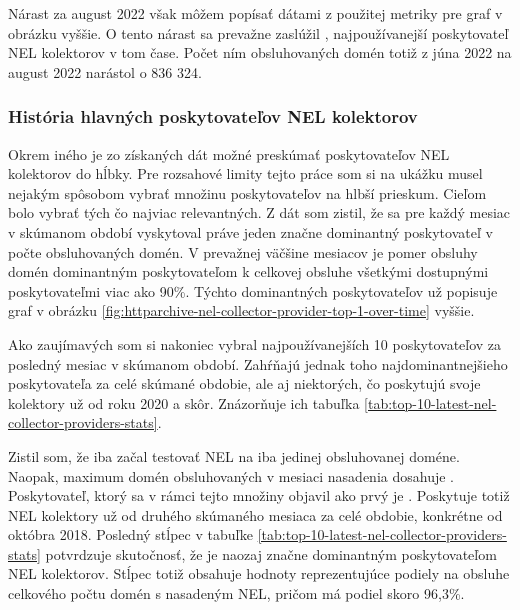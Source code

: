 \pagebreak

Nárast za august 2022 však môžem popísať dátami z použitej metriky pre graf v obrázku vyššie.
O tento nárast sa prevažne zaslúžil , najpoužívanejší poskytovateľ NEL kolektorov v tom čase. 
Počet ním obsluhovaných domén totiž z júna 2022 na august 2022 narástol o 836 324.

\subsubsection{História hlavných poskytovateľov NEL kolektorov}

Okrem iného je zo získaných dát možné preskúmať poskytovateľov NEL kolektorov do hĺbky.
Pre rozsahové limity tejto práce som si na ukážku musel nejakým spôsobom vybrať množinu poskytovateľov na hlbší prieskum.
Cieľom bolo vybrať tých čo najviac relevantných.
Z dát som zistil, že sa pre každý mesiac v skúmanom období vyskytoval práve jeden značne dominantný poskytovateľ v počte obsluhovaných domén.
V prevažnej väčšine mesiacov je pomer obsluhy domén dominantným poskytovateľom k celkovej obsluhe všetkými dostupnými poskytovateľmi viac ako 90\%.
Týchto dominantných poskytovateľov už popisuje graf v obrázku \ref{fig:httparchive-nel-collector-provider-top-1-over-time} vyššie.

Ako zaujímavých som si nakoniec vybral najpoužívanejších 10 poskytovateľov za posledný mesiac v skúmanom období.
Zahŕňajú jednak toho najdominantnejšieho poskytovateľa za celé skúmané obdobie, ale aj niektorých, čo poskytujú svoje kolektory už od roku 2020 a skôr.
Znázorňuje ich tabuľka \ref{tab:top-10-latest-nel-collector-providers-stats}.

Zistil som, že iba  začal testovať NEL na iba jedinej obsluhovanej doméne. Naopak, maximum domén obsluhovaných v mesiaci nasadenia dosahuje .
Poskytovateľ, ktorý sa v rámci tejto množiny objavil ako prvý je .
Poskytuje totiž NEL kolektory už od druhého skúmaného mesiaca za celé obdobie, konkrétne od októbra 2018.
Posledný stĺpec v tabuľke \ref{tab:top-10-latest-nel-collector-providers-stats} potvrdzuje skutočnosť, že  je naozaj značne dominantným poskytovateľom NEL kolektorov.
Stĺpec totiž obsahuje hodnoty reprezentujúce podiely na obsluhe celkového počtu domén s nasadeným NEL, pričom  má podiel skoro 96,3\%.

